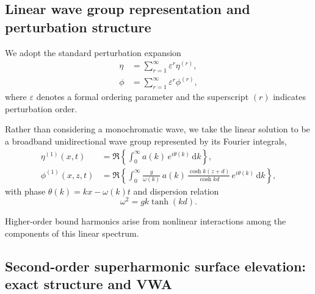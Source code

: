 \documentclass[lineno]{JFM-FLM_Au}
\begin{document}
\subsection{Linear wave group representation and perturbation structure}

We adopt the standard perturbation expansion
\begin{subequations}\label{method:perturbationformsolution}
\begin{align}
\eta &= \sum_{r=1}^{\infty} \varepsilon^r \eta^{(r)}, \\
\phi &= \sum_{r=1}^{\infty} \varepsilon^r \phi^{(r)},
\end{align}
\end{subequations}
where $\varepsilon$ denotes a formal ordering parameter and the superscript $(r)$ indicates perturbation order.

Rather than considering a monochromatic wave, we take the linear solution to be a broadband unidirectional wave group represented by its Fourier integrals,
\begin{subequations}\label{method:linearsolution}
\begin{align}
\eta^{(1)}(x,t)
&=\Re\!\left\{\int_{0}^{\infty} a(k)\,e^{i\theta(k)}\,\mathrm{d}k \right\}, \\
\phi^{(1)}(x,z,t)
&=\Re\!\left\{\int_{0}^{\infty} 
\frac{g}{\omega(k)}\,a(k)\,
\frac{\cosh k(z+d)}{\cosh kd}\,
e^{i\theta(k)}\,\mathrm{d}k \right\},
\end{align}
\end{subequations}
with phase $\theta(k)=kx-\omega(k)t$ and dispersion relation
\[
\omega^2=gk\tanh(kd).
\]

Higher-order bound harmonics arise from nonlinear interactions among the components of this linear spectrum.

\subsection{Second-order superharmonic surface elevation: exact structure and VWA}
\end{document}
